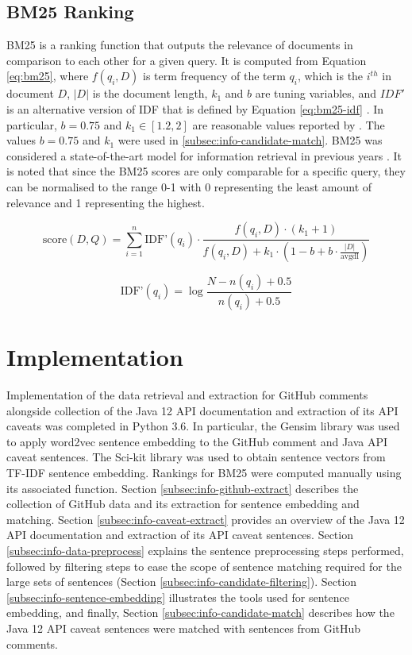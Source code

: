 \subsection{BM25 Ranking}
\label{subsec:info-bm25}
BM25 is a ranking function that outputs the relevance of documents in comparison to each other for a given query. It is computed from Equation \ref{eq:bm25}, where $f(q_i, D)$ is term frequency of the term $q_i$, which is the $i^{th}$ in document $D$, $|D|$ is the document length, $k_1$ and $b$ are tuning variables, and $IDF'$ is an alternative version of IDF that is defined by Equation \ref{eq:bm25-idf} \cite{Manning:2008:IIR:1394399}. In particular, $b=0.75$ and $k_1 \in [1.2,2]$ are reasonable values reported by \citeauthor{Manning:2008:IIR:1394399}. The values $b=0.75$ and $k_1$ were used in \ref{subsec:info-candidate-match}. BM25 was considered a state-of-the-art model for information retrieval in previous years \cite{perez2009integrating}. It is noted that since the BM25 scores are only comparable for a specific query, they can be normalised to the range 0-1 with 0 representing the least amount of relevance and 1 representing the highest.

\begin{equation} \label{eq:bm25} 
\text{score}(D,Q) = \sum_{i=1}^{n} \text{IDF'}(q_i) \cdot \frac{f(q_i, D) \cdot (k_1 + 1)}{f(q_i, D) + k_1 \cdot (1 - b + b \cdot \frac{|D|}{\text{avgdl}})} 
\end{equation}

\begin{equation} \label{eq:bm25-idf} 
\text{IDF'}(q_i) = \log{\frac{N - n(q_i) + 0.5}{n(q_i) + 0.5}}
\end{equation}

\section{Implementation}
\label{sec:info-implement}
Implementation of the data retrieval and extraction for GitHub comments alongside collection of the Java 12 API documentation and extraction of its API caveats was completed in Python 3.6. In particular, the Gensim library was used to apply word2vec sentence embedding to the GitHub comment and Java API caveat sentences. The Sci-kit library was used to obtain sentence vectors from TF-IDF sentence embedding. Rankings for BM25 were computed manually using its associated function. Section \ref{subsec:info-github-extract} describes the collection of GitHub data and its extraction for sentence embedding and matching. Section \ref{subsec:info-caveat-extract} provides an overview of the Java 12 API documentation and extraction of its API caveat sentences. Section \ref{subsec:info-data-preprocess} explains the sentence preprocessing steps performed, followed by filtering steps to ease the scope of sentence matching required for the large sets of sentences (Section \ref{subsec:info-candidate-filtering}). Section \ref{subsec:info-sentence-embedding} illustrates the tools used for sentence embedding, and finally, Section \ref{subsec:info-candidate-match} describes how the Java 12 API caveat sentences were matched with sentences from GitHub comments.

